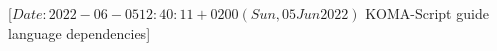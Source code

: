 %
%
%
%
%
%
%
%
                 [$Date: 2022-06-05 12:40:11 +0200 (Sun, 05 Jun 2022) $
                  KOMA-Script guide language dependencies]
%
%
\newcommand*{\GuideSubject}{Die Anleitung}
\newcommand*{\GuideTitle}{\KOMAScript}%
\newcommand*{\GuideSubTitle}{ein wandelbares \LaTeXe-Paket}%
\newcommand*{\GuideAuthorHeadline}{Autoren des \KOMAScript-Pakets}%
\newcommand*{\GuideTranslatorHeadline}{An der deutschen \"Ubersetzung dieser
  Anleitung haben mitgewirkt: }
\newcommand*{\GuideWarrantyHeadline}{Rechtliche Hinweise:}%
